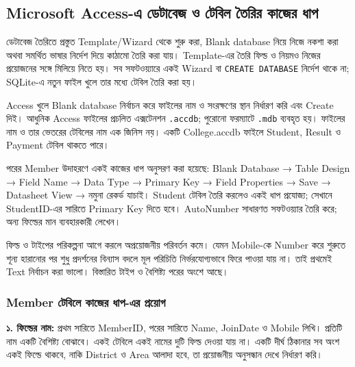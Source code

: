 \subsection{Microsoft Access-এ ডেটাবেজ ও টেবিল তৈরির কাজের ধাপ}
ডেটাবেজ তৈরিতে প্রস্তুত Template/Wizard থেকে শুরু করা, Blank database নিয়ে নিজে নকশা করা অথবা সমর্থিত ভাষার নির্দেশ দিয়ে কাঠামো তৈরি করা যায়। Template-এর তৈরি ফিল্ড ও নিয়মও নিজের প্রয়োজনের সঙ্গে মিলিয়ে নিতে হয়। সব সফটওয়্যারে একই Wizard বা \texttt{CREATE DATABASE} নির্দেশ থাকে না; SQLite-এ নতুন ফাইল খুলে তার মধ্যে টেবিল তৈরি করা হয়।

Access খুলে Blank database নির্বাচন করে ফাইলের নাম ও সংরক্ষণের স্থান নির্ধারণ করি এবং Create দিই। আধুনিক Access ফাইলের প্রচলিত এক্সটেনশন \texttt{.accdb}; পুরোনো ফরম্যাটে \texttt{.mdb} ব্যবহৃত হয়। ফাইলের নাম ও তার ভেতরের টেবিলের নাম এক জিনিস নয়। একটি College.accdb ফাইলে Student, Result ও Payment টেবিল থাকতে পারে।

পরের Member উদাহরণে একই কাজের ধাপ অনুসরণ করা হয়েছে: Blank Database → Table Design → Field Name → Data Type → Primary Key → Field Properties → Save → Datasheet View → নমুনা রেকর্ড যাচাই। Student টেবিল তৈরি করলেও একই ধাপ প্রযোজ্য; সেখানে StudentID-এর সারিতে Primary Key দিতে হবে। AutoNumber সাধারণত সফটওয়্যার তৈরি করে; অন্য ফিল্ডের মান ব্যবহারকারী লেখেন।

ফিল্ড ও টাইপের পরিকল্পনা আগে করলে অপ্রয়োজনীয় পরিবর্তন কমে। যেমন Mobile-কে Number করে শুরুতে শূন্য হারানোর পর শুধু প্রদর্শনের বিন্যাস বদলে মূল পরিচিতি নির্ভরযোগ্যভাবে ফিরে পাওয়া যায় না। তাই প্রথমেই Text নির্বাচন করা ভালো। বিস্তারিত টাইপ ও বৈশিষ্ট্য পরের অংশে আছে।


\subsubsection{Member টেবিলে কাজের ধাপ-এর প্রয়োগ}
\textbf{১. ফিল্ডের নাম:} প্রথম সারিতে MemberID, পরের সারিতে Name, JoinDate ও Mobile লিখি। প্রতিটি নাম একটি বৈশিষ্ট্য বোঝাবে। একই টেবিলে একই নামের দুটি ফিল্ড দেওয়া যায় না। একটি দীর্ঘ ঠিকানার সব অংশ একই ফিল্ডে থাকবে, নাকি District ও Area আলাদা হবে, তা প্রয়োজনীয় অনুসন্ধান দেখে নির্ধারণ করি।


